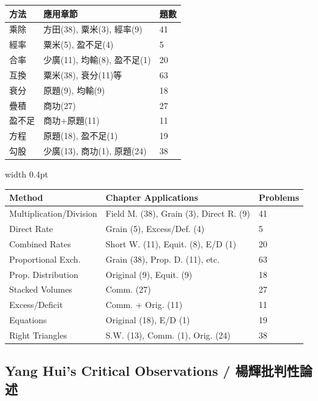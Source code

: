 \documentclass[10pt,a4paper]{article}
\newcommand{\zh}[1]{{\CJKfamily{notocjksc}#1}}
\newcommand{\bilingual}[2]{%
  \par\smallskip\noindent%
  \begin{minipage}[t]{0.47\textwidth}%
    \RaggedRight\small #1%
  \end{minipage}%
  \hfill\vrule width 0.4pt\hfill%
  \begin{minipage}[t]{0.47\textwidth}%
    \RaggedRight\small #2%
  \end{minipage}%
  \par\smallskip%
}
\begin{document}
\bilingual{
  \begin{tabular}{|l|l|l|}
  \hline
  \textbf{方法} & \textbf{應用章節} & \textbf{題數} \\
  \hline
  \zh{乘除} & \zh{方田}(38), \zh{粟米}(3), \zh{經率}(9) & 41 \\
  \hline
  \zh{經率} & \zh{粟米}(5), \zh{盈不足}(4) & 5 \\
  \hline
  \zh{合率} & \zh{少廣}(11), \zh{均輸}(8), \zh{盈不足}(1) & 20 \\
  \hline
  \zh{互換} & \zh{粟米}(38), \zh{衰分}(11)等 & 63 \\
  \hline
  \zh{衰分} & 原題(9), \zh{均輸}(9) & 18 \\
  \hline
  \zh{疊積} & \zh{商功}(27) & 27 \\
  \hline
  \zh{盈不足} & \zh{商功}+原題(11) & 11 \\
  \hline
  \zh{方程} & 原題(18), \zh{盈不足}(1) & 19 \\
  \hline
  \zh{勾股} & \zh{少廣}(13), \zh{商功}(1), 原題(24) & 38 \\
  \hline
  \end{tabular}
}{%
  \begin{tabular}{|l|l|l|}
  \hline
  \textbf{Method} & \textbf{Chapter Applications} & \textbf{Problems} \\
  \hline
  Multiplication/Division & Field M. (38), Grain (3), Direct R. (9) & 41 \\
  \hline
  Direct Rate & Grain (5), Excess/Def. (4) & 5 \\
  \hline
  Combined Rates & Short W. (11), Equit. (8), E/D (1) & 20 \\
  \hline
  Proportional Exch. & Grain (38), Prop. D. (11), etc. & 63 \\
  \hline
  Prop. Distribution & Original (9), Equit. (9) & 18 \\
  \hline
  Stacked Volumes & Comm. (27) & 27 \\
  \hline
  Excess/Deficit & Comm. + Orig. (11) & 11 \\
  \hline
  Equations & Original (18), E/D (1) & 19 \\
  \hline
  Right Triangles & S.W. (13), Comm. (1), Orig. (24) & 38 \\
  \hline
  \end{tabular}
}

\subsection{Yang Hui's Critical Observations / 楊輝批判性論述}
\end{document}
